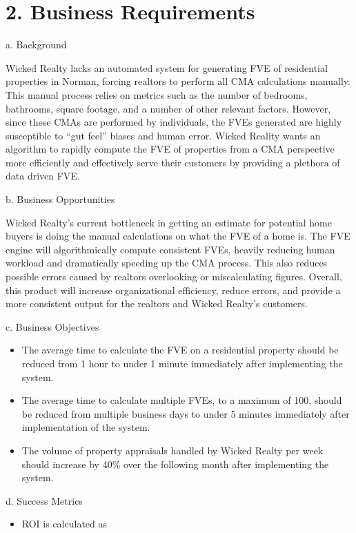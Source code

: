 \hypertarget{business-requirements}{%
\section{2. Business Requirements}\label{business-requirements}}

a. Background

Wicked Realty lacks an automated system for generating FVE of
residential properties in Norman, forcing realtors to perform all CMA
calculations manually. This manual process relies on metrics such as the
number of bedrooms, bathrooms, square footage, and a number of other
relevant factors. However, since these CMAs are performed by
individuals, the FVEs generated are highly susceptible to ``gut feel''
biases and human error. Wicked Reality wants an algorithm to rapidly
compute the FVE of properties from a CMA perspective more efficiently
and effectively serve their customers by providing a plethora of data
driven FVE.

b. Business Opportunities

Wicked Realty's current bottleneck in getting an estimate for potential
home buyers is doing the manual calculations on what the FVE of a home
is. The FVE engine will algorithmically compute consistent FVEs, heavily
reducing human workload and dramatically speeding up the CMA process.
This also reduces possible errors caused by realtors overlooking or
miscalculating figures. Overall, this product will increase
organizational efficiency, reduce errors, and provide a more consistent
output for the realtors and Wicked Realty's customers.

c. Business Objectives

\begin{itemize}
\item
  The average time to calculate the FVE on a residential property should
  be reduced from 1 hour to under 1 minute immediately after
  implementing the system.
\item
  The average time to calculate multiple FVEs, to a maximum of 100,
  should be reduced from multiple business days to under 5 minutes
  immediately after implementation of the system.
\item
  The volume of property appraisals handled by Wicked Realty per week
  should increase by 40\% over the following month after implementing
  the system.
\end{itemize}

d. Success Metrics

\begin{itemize}
\item
  ROI is calculated as
\end{itemize}

